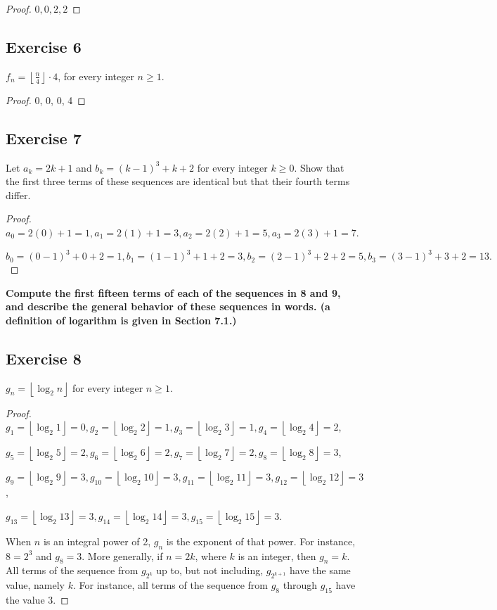 \documentclass[14pt]{extarticle}
\newcommand{\dps}{\displaystyle}
\newcommand{\floor}[1]{{\left\lfloor#1\right\rfloor}}
\newcommand{\cy}{\color{cyan}}
\begin{document}
\begin{proof}
$0, 0, 2, 2$
\end{proof}

\subsection{Exercise 6}
$\dps f_n  = \floor{\frac{n}{4}}\cdot 4$, for every integer $n \geq 1$.

\begin{proof}
0, 0, 0, 4
\end{proof}

\subsection{Exercise 7}
Let $a_k = 2k + 1$ and $b_k = (k - 1)^3 + k + 2$ for every integer $k \geq 0$. Show that the first three terms of these sequences are identical but that their fourth terms differ.

\begin{proof}
$a_0 = 2(0) + 1 = 1, a_1 = 2(1) + 1 = 3, a_2 = 2(2) + 1 = 5, a_3 = 2(3) + 1 = 7$.

$b_0 = (0-1)^3 + 0 + 2 = 1, b_1 = (1-1)^3 + 1 + 2 = 3, b_2 = (2-1)^3 + 2 + 2 = 5, b_3 = (3-1)^3 + 3 + 2 = 13.$
\end{proof}

{\bf\cy Compute the first fifteen terms of each of the sequences in 8 and 9, and describe the general behavior of these sequences in words. (a definition of logarithm is given in Section 7.1.)}

\subsection{Exercise 8}
$g_n = \floor{\log_2 n}$ for every integer $n \geq 1$.

\begin{proof}
$g_1 = \floor{\log_2 1} = 0, g_2 = \floor{\log_2 2} = 1, g_3 = \floor{\log_2 3} = 1, g_4 = \floor{\log_2 4} = 2$,

$g_5 = \floor{\log_2 5} = 2, g_6 = \floor{\log_2 6} = 2, g_7 = \floor{\log_2 7} = 2, g_8 = \floor{\log_2 8} = 3$, 

$g_9 = \floor{\log_2 9} = 3, g_{10} = \floor{\log_2 10} = 3, g_{11} = \floor{\log_2 11} = 3, g_{12} = \floor{\log_2 12} = 3$, 

$g_{13} = \floor{\log_2 13} = 3, g_{14} = \floor{\log_2 14} = 3, g_{15} = \floor{\log_2 15} = 3$.

When $n$ is an integral power of 2, $g_n$ is the exponent of that power. For instance, $8 = 2^3$ and $g_8 = 3$. More generally, if $n = 2k$, where $k$ is an integer, then $g_n = k$. All terms of the sequence from $g_{2^k}$ up to, but not including, $g_{2^{k+1}}$ have the same value, namely $k$. For instance, all terms of the sequence from $g_8$ through $g_{15}$ have the value 3.
\end{proof}
\end{document}
